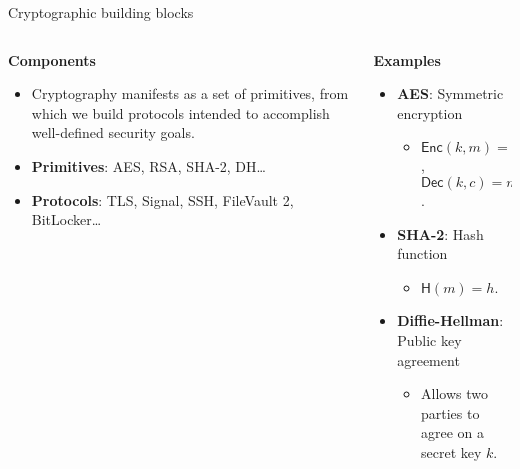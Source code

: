 \documentclass[aspectratio=169, lualatex, handout]{beamer}
\begin{document}
\begin{frame}{Cryptographic building blocks}
	\begin{columns}[c]
		\begin{column}{0.5\textwidth}
			\textbf{Components}
			\begin{itemize}[<+->]
				\item Cryptography manifests as a set of primitives, from which we
				      build protocols intended to accomplish well-defined security goals.
				\item \textbf{Primitives}: AES, RSA, SHA-2, DH\ldots
				\item \textbf{Protocols}: TLS, Signal, SSH, FileVault 2, BitLocker\ldots
			\end{itemize}
		\end{column}

		\begin{column}{0.5\textwidth}
			\textbf{Examples}
			\begin{itemize}[<+->]
				\item \textbf{AES}: Symmetric encryption
				      \begin{itemize}
					      \item $\mathsf{Enc}(k, m) = c$, $\mathsf{Dec}(k, c) = m$.
				      \end{itemize}
				\item \textbf{SHA-2}: Hash function
				      \begin{itemize}
					      \item $\mathsf{H}(m) = h$.
				      \end{itemize}
				\item \textbf{Diffie-Hellman}: Public key agreement
				      \begin{itemize}
					      \item Allows two parties to agree on a secret key $k$.
				      \end{itemize}
			\end{itemize}
		\end{column}
	\end{columns}
\end{frame}
\end{document}
